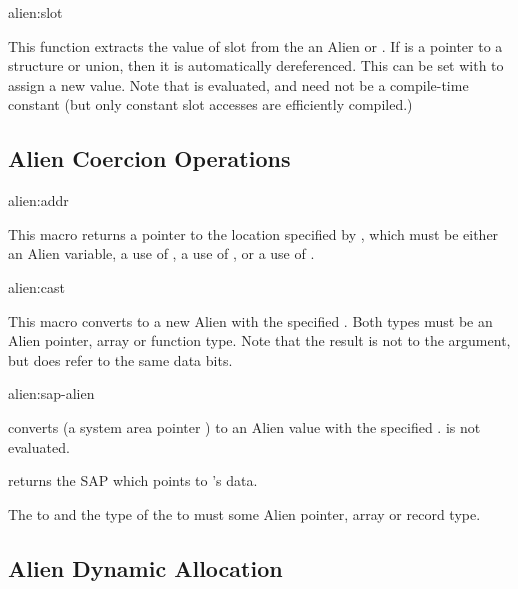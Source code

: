 \begin{defun}{alien:}{slot}{}
  
  This function extracts the value of slot  from the an
  Alien  or .  If  is a
  pointer to a structure or union, then it is automatically
  dereferenced.  This can be set with  to assign a new
  value.  Note that  is evaluated, and need not be a
  compile-time constant (but only constant slot accesses are
  efficiently compiled.)
\end{defun}


\subsection{Alien Coercion Operations}

\begin{defmac}{alien:}{addr}{}
  
  This macro returns a pointer to the location specified by
  , which must be either an Alien variable, a use of
  , a use of , or a use of
  .
\end{defmac}

\begin{defmac}{alien:}{cast}{ }
  
  This macro converts  to a new Alien with the specified
  .  Both types must be an Alien pointer, array or
  function type.  Note that the result is not  to the
  argument, but does refer to the same data bits.
\end{defmac}

\begin{defmac}{alien:}{sap-alien}{ }
  
   converts  (a system area pointer
  ) to an Alien value with the specified
  .   is not evaluated.

 returns the SAP which points to 's
data.

The  to  and the type of the  to
 must some Alien pointer, array or record type.
\end{defmac}


\subsection{Alien Dynamic Allocation}

